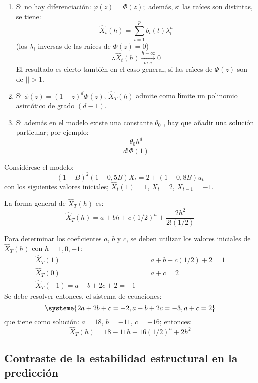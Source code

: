 \begin{observacion}

\begin{enumerate}
\item Si no hay diferenciaci\'{o}n: $\varphi (z)=\Phi (z);$ adem\'{a}s, si las ra\'{i}ces son distintas, se tiene:
\[
 \widehat{X} _{t} (h)=\sum_{i=1}^p {b_{i} 
(t)\lambda_{i}^{h} }
\]
(los $\lambda_i$ inversas de las ra\'{i}ces de $\Phi(z)=0$)
\[
\therefore \widehat{X} _{t} (h) \xrightarrow[m.c.]{h-\infty} 0 
\]
El resultado es cierto tambi\'{e}n en el caso general, si las ra\'{\i}ces de 
$\Phi (z)$ son de $\left| \right|>1$.


\item Si $\phi(z)=(1-z)^{d} \Phi (z)$, $\widehat{X}_{T}(h)$ admite como l\'{\i}mite un polinomio asint\'{o}tico de grado $(d-1)$.

\item Si adem\'{a}s en el modelo existe una constante $\theta_{0}$ , hay que a\~{n}adir una soluci\'{o}n particular; por ejemplo:
\[
\frac{\theta_{0} h^{d}}{d!\Phi (1)}
\]
\end{enumerate}
\end{observacion}

\begin{ejemplo}
Consid\'{e}rese el modelo;
\[
(1-B)^{2} (1-0,5B) X_{t}=2+(1- 0,8B) u_{t} 
\]
con los siguientes valores iniciales; $\widehat{X} _{t} (1)= 1$, $X_{t}= 2$, $X_{t-1} =-1$.

La forma general de $\widehat{X} _{T} (h)$ es:
\[
\widehat{X} _{T} (h)= a + bh + c(1/2)^{h} +\frac{2h^{2}}{2!(1/2)}
\]

Para determinar los coeficientes $a$, $b$ y $c$, se deben utilizar los valores 
iniciales de $\widehat{X} _{T} (h)$ con $h=1, 0, -1$:
\begin{align*}
\widehat{X} _{T} (1)&= a+b+c(1/2)+2 =1\\
\widehat{X} _{T} (0)&= a+c = 2\\
\widehat{X} _{T} (-1)= a- b+ 2c + 2= -1 
\end{align*}
Se debe resolver entonces, el sistema de ecuaciones:
\[
\systeme{
2a+2b+c=-2, a-b+2c=-3 , a+c=2
}
\]
que tiene como soluci\'{o}n: $a=18$, $b=-11$, $c=-16$; entonces:
\[
 \widehat{X}_{T} (h)=18 - 11 h -16(1/2)^{h} + 2h^{2}
\]
\end{ejemplo}


\subsection{Contraste de la estabilidad estructural en la predicci\'{o}n }

